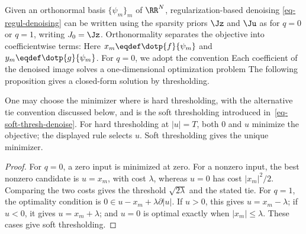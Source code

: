 Given an orthonormal basis $\{\psi_m\}_m$ of $\RR^N$, regularization-based denoising \eqref{eq-regul-denoising} can be written using the sparsity priors $\Jz$ and $\Ju$ as
for $q=0$ or $q=1$, writing $J_0=\Jz$. Orthonormality separates the objective into coefficientwise terms:
Here $x_m \eqdef \dotp{f}{\psi_m}$ and $y_m \eqdef \dotp{g}{\psi_m}$. For $q=0$, we adopt the convention
Each coefficient of the denoised image solves a one-dimensional optimization problem
The following proposition gives a closed-form solution by thresholding.

\begin{prop}\label{prop-equiv-sparse-thresh}
One may choose the minimizer
where 
is hard thresholding, with the alternative tie convention discussed below, and
is the soft thresholding introduced in~\eqref{eq-soft-thresh-denoise}. For hard thresholding at $|u|=T$, both $0$ and $u$ minimize the objective; the displayed rule selects $u$. Soft thresholding gives the unique minimizer.
\end{prop}

	
\begin{proof}
For $q=0$, a zero input is minimized at zero. For a nonzero input, the best nonzero candidate is $u=x_m$, with cost $\lambda$, whereas $u=0$ has cost $|x_m|^2/2$. Comparing the two costs gives the threshold $\sqrt{2\lambda}$ and the stated tie.
For $q=1$, the optimality condition is $0\in u-x_m+\lambda\partial|u|$. If $u>0$, this gives $u=x_m-\lambda$; if $u<0$, it gives $u=x_m+\lambda$; and $u=0$ is optimal exactly when $|x_m|\leq\lambda$. These cases give soft thresholding.

\end{proof}

